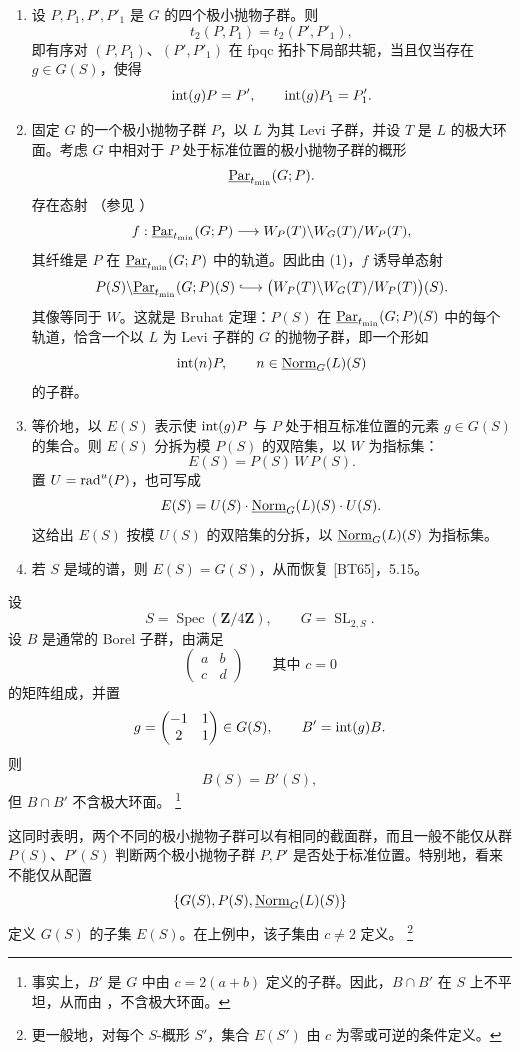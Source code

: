 \begin{enumerate}[label=\textup{(\arabic*)}]
\item 设 \(P,P_1,P',P'_1\) 是 \(G\) 的四个极小抛物子群。则
\[
 t_2(P,P_1)=t_2(P',P'_1),
\]
即有序对 \((P,P_1)\)、\((P',P'_1)\) 在 fpqc 拓扑下局部共轭，当且仅当存在 \(g\in G(S)\)，使得
\[
 \operatorname{int}(g)P=P',\qquad \operatorname{int}(g)P_1=P'_1.
\]

\item 固定 \(G\) 的一个极小抛物子群 \(P\)，以 \(L\) 为其 Levi 子群，并设 \(T\) 是 \(L\) 的极大环面。考虑 \(G\) 中相对于 \(P\) 处于标准位置的极小抛物子群的概形
\[
 \underline{\operatorname{Par}}_{t_{\min}}(G;P).
\]
存在态射 \textup{（参见 ）}
\[
 f:\underline{\operatorname{Par}}_{t_{\min}}(G;P)
   \longrightarrow W_P(T)\backslash W_G(T)/W_P(T),
\]
其纤维是 \(P\) 在 \(\underline{\operatorname{Par}}_{t_{\min}}(G;P)\) 中的轨道。因此由 \textup{(1)}，\(f\) 诱导单态射
\[
 P(S)\backslash\Par_{t_{\min}}(G;P)(S)
 \lhook\joinrel\longrightarrow
 \bigl(W_P(T)\backslash W_G(T)/W_P(T)\bigr)(S).
\]
其像等同于 \(W\)。这就是 Bruhat 定理：\(P(S)\) 在 \(\underline{\operatorname{Par}}_{t_{\min}}(G;P)(S)\) 中的每个轨道，恰含一个以 \(L\) 为 Levi 子群的 \(G\) 的抛物子群，即一个形如
\[
 \operatorname{int}(n)P,\qquad n\in\underline{\operatorname{Norm}}_G(L)(S)
\]
的子群。

\item 等价地，以 \(E(S)\) 表示使 \(\operatorname{int}(g)P\) 与 \(P\) 处于相互标准位置的元素 \(g\in G(S)\) 的集合。则 \(E(S)\) 分拆为模 \(P(S)\) 的双陪集，以 \(W\) 为指标集：
\[
 E(S)=P(S)\,W\,P(S).
\]
置 \(U=\operatorname{rad}^u(P)\)，也可写成
\[
 E(S)=U(S)\cdot\underline{\operatorname{Norm}}_G(L)(S)\cdot U(S).
\]
这给出 \(E(S)\) 按模 \(U(S)\) 的双陪集的分拆，以 \(\underline{\operatorname{Norm}}_G(L)(S)\) 为指标集。

\item 若 \(S\) 是域的谱，则 \(E(S)=G(S)\)，从而恢复 \textup{[BT65]}，5.15。
\end{enumerate}

\begin{sgastatement}{}
设
\[
 S=\operatorname{Spec}(\mathbf Z/4\mathbf Z),
 \qquad G=\operatorname{SL}_{2,S}.
\]
设 \(B\) 是通常的 Borel 子群，由满足
\[
 \begin{pmatrix}a&b\\c&d\end{pmatrix}
 \qquad\text{其中 }c=0
\]
的矩阵组成，并置
\[
 g=\begin{pmatrix}-1&1\\2&1\end{pmatrix}\in G(S),
 \qquad B'=\operatorname{int}(g)B.
\]
则
\[
 B(S)=B'(S),
\]
但 \(B\cap B'\) 不含极大环面。
\footnote{事实上，\(B'\) 是 \(G\) 中由 \(c=2(a+b)\) 定义的子群。因此，\(B\cap B'\) 在 \(S\) 上不平坦，从而由 ，不含极大环面。}

这同时表明，两个不同的极小抛物子群可以有相同的截面群，而且一般不能仅从群 \(P(S)\)、\(P'(S)\) 判断两个极小抛物子群 \(P,P'\) 是否处于标准位置。特别地，看来不能仅从配置
\[
 \{G(S),P(S),\underline{\operatorname{Norm}}_G(L)(S)\}
\]
定义 \(G(S)\) 的子集 \(E(S)\)。在上例中，该子集由 \(c\ne2\) 定义。
\footnote{更一般地，对每个 \(S\)-概形 \(S'\)，集合 \(E(S')\) 由 \(c\) 为零或可逆的条件定义。}
\end{sgastatement}

